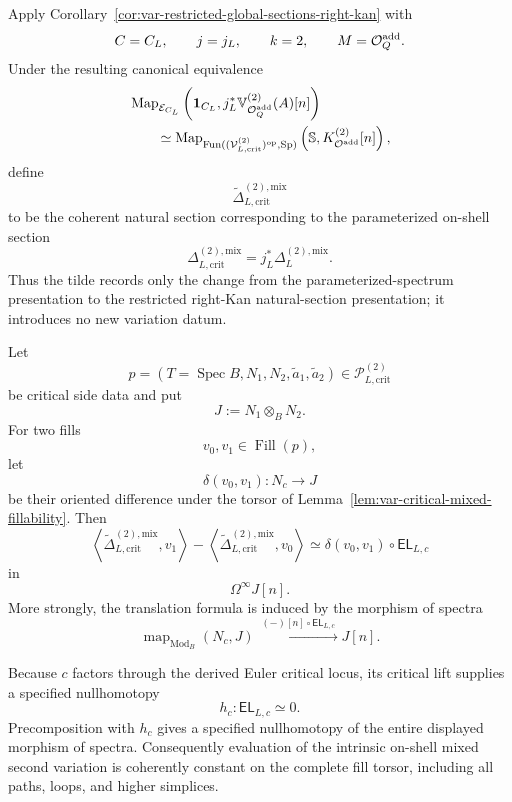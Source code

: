 \begin{construction}
\label{con:var-critical-mixed-natural-section}
Apply Corollary~\ref{cor:var-restricted-global-sections-right-kan} with
\[
    C=C_L,
    \qquad
    j=j_L,
    \qquad
    k=2,
    \qquad
    M=\mathcal O^{\mathrm{add}}_Q.
\]
Under the resulting canonical equivalence
\[
\begin{aligned}
    &
    \operatorname{Map}_{\mathcal E_{C_L}}
    \left(
      \mathbf 1_{C_L},
      j_L^*\mathbb V^{(2)}_{\mathcal O^{\mathrm{add}}_Q}(A)[n]
    \right)
    \\
    &\qquad\simeq
    \operatorname{Map}_{
      \operatorname{Fun}(
        (\mathcal V^{(2)}_{L,\mathrm{crit}})^{\mathrm{op}},
        \operatorname{Sp}
      )
    }
    \left(
      \mathbb S,
      K_{\mathcal O^{\mathrm{add}}}^{(2)}[n]
    \right),
\end{aligned}
\]
define
\[
    \boxed{
    \widetilde\Delta_{L,\mathrm{crit}}^{(2),\mathrm{mix}}
    }
\]
to be the coherent natural section corresponding to the parameterized on-shell section
\[
    \Delta_{L,\mathrm{crit}}^{(2),\mathrm{mix}}
    =
    j_L^*\Delta_L^{(2),\mathrm{mix}}.
\]
Thus the tilde records only the change from the parameterized-spectrum presentation to the restricted right-Kan natural-section presentation; it introduces no new variation datum.
\end{construction}

\begin{proposition}
\label{prop:var-critical-mixed-lift-independence}
Let
\[
    p=(T=\operatorname{Spec}B,N_1,N_2,\widetilde a_1,\widetilde a_2)
    \in\mathcal P^{(2)}_{L,\mathrm{crit}}
\]
be critical side data and put
\[
    J:=N_1\otimes_BN_2.
\]
For two fills
\[
    v_0,v_1\in\operatorname{Fill}(p),
\]
let
\[
    \delta(v_0,v_1):N_c\longrightarrow J
\]
be their oriented difference under the torsor of Lemma~\ref{lem:var-critical-mixed-fillability}.  Then
\[
    \boxed{
    \left\langle
      \widetilde\Delta_{L,\mathrm{crit}}^{(2),\mathrm{mix}},
      v_1
    \right\rangle
    -
    \left\langle
      \widetilde\Delta_{L,\mathrm{crit}}^{(2),\mathrm{mix}},
      v_0
    \right\rangle
    \simeq
    \delta(v_0,v_1)\circ\mathsf{EL}_{L,c}
    }
\]
in
\[
    \Omega^\infty J[n].
\]
More strongly, the translation formula is induced by the morphism of spectra
\[
    \boxed{
    \operatorname{map}_{\operatorname{Mod}_B}(N_c,J)
    \xrightarrow{\;(-)[n]\circ\mathsf{EL}_{L,c}\;}
    J[n].
    }
\]

Because \(c\) factors through the derived Euler critical locus, its critical lift supplies a specified nullhomotopy
\[
    h_c:\mathsf{EL}_{L,c}\simeq0.
\]
Precomposition with \(h_c\) gives a specified nullhomotopy of the entire displayed morphism of spectra.  Consequently evaluation of the intrinsic on-shell mixed second variation is coherently constant on the complete fill torsor, including all paths, loops, and higher simplices.
\end{proposition}

